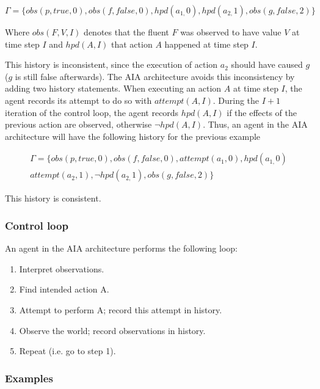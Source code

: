 $$
\Gamma=\{obs\left(p,true,0\right),obs\left(f,false,0\right),hpd\left(a_{1,}0\right),hpd\left(a_{2,}1\right),obs\left(g,false,2\right)\}
$$

Where $obs(F, V, I)$ denotes that the fluent $F$ was observed to have value $V$ at time step $I$ and $hpd(A, I)$ that action $A$ happened at time step $I$.

This history is inconsistent, since the execution of action $a_2$ should have caused $g$ ($g$ is still false afterwards).
The AIA architecture avoids this inconsistency by adding two history statements.
When executing an action $A$ at time step $I$, the agent records its attempt to do so with $attempt(A, I)$.
During the $I+1$ iteration of the control loop, the agent records $hpd(A, I)$ if the effects of the previous action are observed, otherwise $\neg hpd(A, I)$.
Thus, an agent in the AIA architecture will have the following history for the previous example

\begin{multline*}
    \Gamma=\{
        obs\left(p,true,0\right),obs\left(f,false,0\right),attempt(a_1, 0),hpd\left(a_{1,}0\right) \\
        attempt(a_2, 1), \neg hpd\left(a_{2,}1\right),obs\left(g,false,2\right)
    \}
\end{multline*}

This history is consistent.

\subsubsection{Control loop}
\label{subsubsec:control_loop}

An agent in the AIA architecture performs the following loop:

\begin{enumerate}
    \item Interpret observations.
    \item Find intended action A.
    \item Attempt to perform A;
        record this attempt in history.
    \item Observe the world;
        record observations in history.
    \item Repeat (i.e. go to step 1).
\end{enumerate}

\subsubsection{Examples}
\label{subsubsec:aia_examples}

